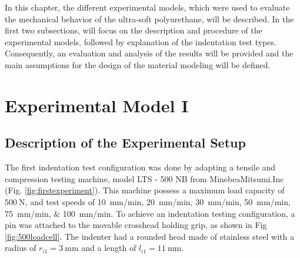 In this chapter, the different experimental models, which were used to evaluate the 
mechanical behavior of the ultra-soft polyurethane, will be 
described. In the first two subsections, will focus on the description and 
procedure of the experimental models, followed by explanation of the indentation test 
types. Consequently, an evaluation and analysis of the results will be provided and the 
main assumptions for the design of the material modeling will be defined. 
\\ 


\section{Experimental Model I}
\label{section:expmod1}
    
\subsection*{Description of the Experimental Setup}

The first indentation test configuration was done by adapting a tensile and compression 
testing machine, model LTS - 500 NB from MinebeaMitsumi.Inc (Fig. \ref{fig:firstexperiment}). This 
machine possess a maximum load capacity of $\SI{500}{\newton}$, and test speeds of
\SIlist[per-mode = symbol]{10;20;30;50;75;100}{\milli \metre \per \minute}. To achieve an 
indentation testing configuration, a pin was attached to the movable crosshead holding grip, 
as shown in Fig \ref{fig:500loadcell}.
The indenter had a rounded head made of stainless steel with a
radius of $r_{i1} = \SI{3}{\milli \m}$ and a length of $l_{i1} = \SI{11}{\milli \m}$.

